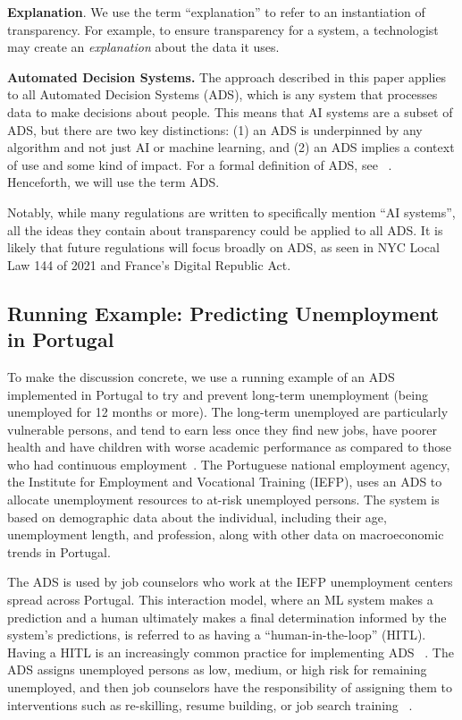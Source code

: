 \documentclass[sigconf, nonacm]{acmart}
\begin{document}
{\bf Explanation}. We use the term ``explanation'' to refer to an instantiation of transparency. For example, to ensure transparency for a system, a technologist may create an \emph{explanation} about the data it uses.

\label{terms}

{\bf Automated Decision Systems.} The approach described in this paper applies to all Automated Decision Systems (ADS), which is any system that processes data to make decisions about people. This means that AI systems are a subset of ADS, but there are two key distinctions: (1) an ADS is underpinned by any algorithm and not just AI or machine learning, and (2) an ADS implies a context of use and some kind of impact. For a formal definition of ADS, see ~\cite{DBLP:journals/pvldb/StoyanovichHJ20}. Henceforth, we will use the term ADS.

Notably, while many regulations are written to specifically mention ``AI systems'', all the ideas they contain about transparency could be applied to all ADS. It is likely that future regulations will focus broadly on ADS, as seen in NYC Local Law 144 of 2021 and France's Digital Republic Act.

\subsection{Running Example: Predicting Unemployment in Portugal}

To make the discussion concrete, we use a running example of an ADS implemented in Portugal to try and prevent long-term unemployment (being unemployed for 12 months or more). The long-term unemployed are particularly vulnerable persons, and tend to earn less once they find new jobs, have poorer health and have children with worse academic performance as compared to those who had continuous employment~\cite{nichols2013consequences}. The Portuguese national employment agency, the Institute for Employment and Vocational Training (IEFP), uses an ADS to allocate unemployment resources to at-risk unemployed persons. The system is based on demographic data about the individual, including their age, unemployment length, and profession, along with other data on macroeconomic trends in Portugal.

The ADS is used by job counselors who work at the IEFP unemployment centers spread across Portugal. This interaction model, where an ML system makes a prediction and a human ultimately makes a final determination informed by the system's predictions, is referred to as having a ``human-in-the-loop'' (HITL). Having a HITL is an increasingly common practice for implementing ADS ~\cite{gillingham2019can,wagner2019liable,raso2017displacement}. The ADS assigns unemployed persons as low, medium, or high risk for remaining unemployed, and then job counselors have the responsibility of assigning them to interventions such as re-skilling, resume building, or job search training ~\cite{zejnilovic2020algorithmic}.
\end{document}
